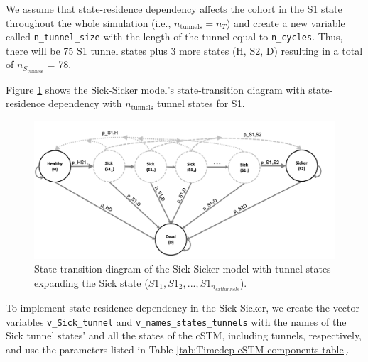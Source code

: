 \documentclass[
]{article}
\begin{document}
We assume that state-residence dependency affects the cohort in the S1 state throughout the whole simulation (i.e., \(n_{\text{tunnels}}=n_T\)) and create a new variable called \texttt{n\_tunnel\_size} with the length of the tunnel equal to \texttt{n\_cycles}. Thus, there will be 75 S1 tunnel states plus 3 more states (H, S2, D) resulting in a total of \(n_{S_{\text{tunnels}}}\) = 78.

Figure \ref{fig:STD-Sick-Sicker-tunnels} shows the Sick-Sicker model's state-transition diagram with state-residence dependency with \(n_{\text{tunnels}}\) tunnel states for S1.

\begin{figure}[H]

{\centering \includegraphics[width=1\linewidth]{figs/Sick-Sicker-with-tunnels} 

}

\caption{State-transition diagram of the Sick-Sicker model with tunnel states expanding the Sick state ($S1_1, S1_2,...,S1_{n_{ ext{tunnels}}}$).}\label{fig:STD-Sick-Sicker-tunnels}
\end{figure}

To implement state-residence dependency in the Sick-Sicker, we create the vector variables \texttt{v\_Sick\_tunnel} and \texttt{v\_names\_states\_tunnels} with the names of the Sick tunnel states' and all the states of the cSTM, including tunnels, respectively, and use the parameters listed in Table \ref{tab:Timedep-cSTM-components-table}.
\end{document}
